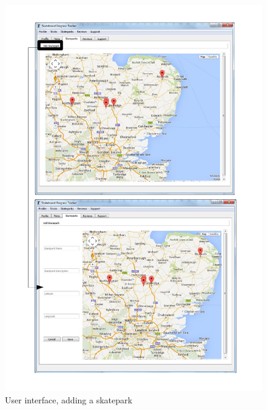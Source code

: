 \begin{figure}[H]
    \includegraphics[width=\textwidth]{./Maintenance/Figures/AddSkatepark.pdf}
    \caption{User interface, adding a skatepark} \label{fig:Add Skatepark UI}
\end{figure}


